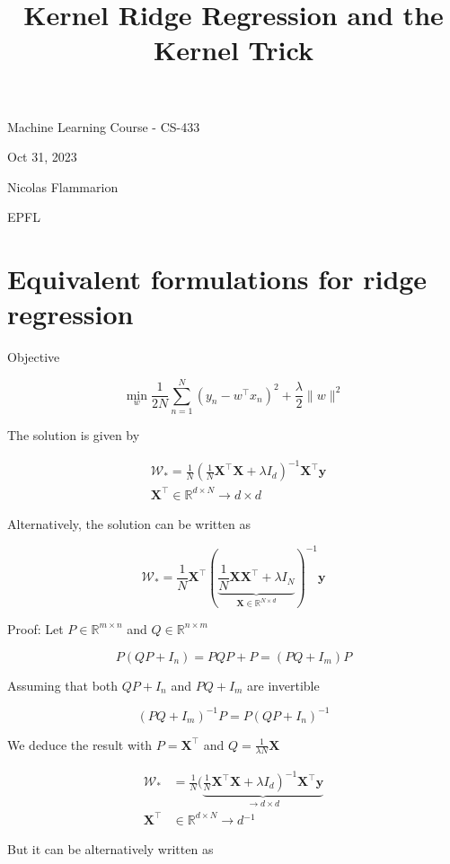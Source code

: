 \documentclass[10pt]{article}
\title{Kernel Ridge Regression and the Kernel Trick }
\author{}
\date{}
\begin{document}
\maketitle
Machine Learning Course - CS-433

Oct 31, 2023

Nicolas Flammarion

EPFL

\section*{Equivalent formulations for ridge regression}
Objective

$$
\min _{w} \frac{1}{2 N} \sum_{n=1}^{N}\left(y_{n}-w^{\top} x_{n}\right)^{2}+\frac{\lambda}{2}\|w\|^{2}
$$

The solution is given by

$$
\begin{aligned}
& \mathcal{W}_{*}=\frac{1}{N}\left(\frac{1}{N} \mathbf{X}^{\top} \mathbf{X}+\lambda I_{d}\right)^{-1} \mathbf{X}^{\top} \mathbf{y} \\
& \mathbf{X}^{\top} \in \mathbb{R}^{d \times N} \rightarrow d \times d
\end{aligned}
$$

Alternatively, the solution can be written as

$$
\mathcal{W}_{*}=\frac{1}{N} \mathbf{X}^{\top}(\underbrace{\frac{1}{N} \mathbf{X X}^{\top}+\lambda I_{N}}_{\mathbf{X} \in \mathbb{R}^{N \times d}})^{-1} \mathbf{y}
$$

Proof: Let $P \in \mathbb{R}^{m \times n}$ and $Q \in \mathbb{R}^{n \times m}$

$$
P\left(Q P+I_{n}\right)=P Q P+P=\left(P Q+I_{m}\right) P
$$

Assuming that both $Q P+I_{n}$ and $P Q+I_{m}$ are invertible

$$
\left(P Q+I_{m}\right)^{-1} P=P\left(Q P+I_{n}\right)^{-1}
$$

We deduce the result with $P=\mathbf{X}^{\top}$ and $Q=\frac{1}{\lambda N} \mathbf{X}$

$$
\begin{aligned}
\mathcal{W}_{*} & =\frac{1}{N}(\underbrace{\left.\frac{1}{N} \mathbf{X}^{\top} \mathbf{X}+\lambda I_{d}\right)^{-1} \mathbf{X}^{\top} \mathbf{y}}_{\rightarrow d \times d} \\
\mathbf{X}^{\top} & \in \mathbb{R}^{d \times N} \rightarrow d{ }^{-1}
\end{aligned}
$$

But it can be alternatively written as
\end{document}
